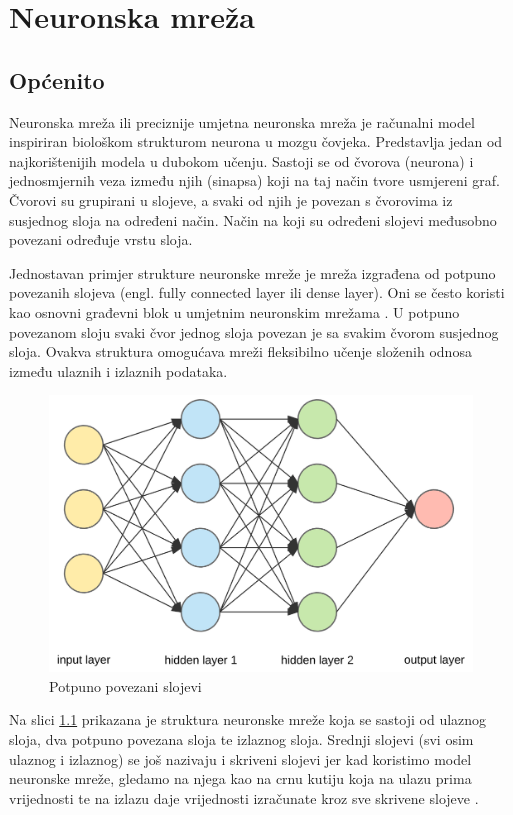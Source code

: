 \chapter{Neuronska mreža}
\label{pog:neuronska_mreza}

\section{Općenito}

Neuronska mreža ili preciznije umjetna neuronska mreža je računalni model inspiriran
biološkom strukturom neurona u mozgu čovjeka. Predstavlja jedan od najkorištenijih modela 
u dubokom učenju. Sastoji se od čvorova (neurona) i jednosmjernih
veza između njih (sinapsa) koji na taj način tvore usmjereni graf. Čvorovi su grupirani u slojeve,
a svaki od njih je povezan s čvorovima iz susjednog sloja na određeni način. Način na koji su
određeni slojevi međusobno povezani određuje vrstu sloja. 

Jednostavan primjer strukture neuronske mreže je mreža izgrađena od potpuno povezanih slojeva 
(engl. fully connected layer ili dense layer). Oni se često koristi kao osnovni građevni blok u 
umjetnim neuronskim mrežama \cite{dense}.
U potpuno povezanom sloju svaki čvor jednog sloja povezan je sa svakim čvorom susjednog sloja.
Ovakva struktura omogućava mreži fleksibilno učenje složenih odnosa između ulaznih i izlaznih podataka.

\begin{figure}[htb]
  \centering
  \includegraphics[width=0.5\linewidth]{Chapters/neuronska_mreza/dense_layer.png} 
  \caption{Potpuno povezani slojevi \cite{dense}}
  \label{pic:dense_layer}
\end{figure}

Na slici \ref{pic:dense_layer} prikazana je struktura neuronske mreže koja se sastoji od ulaznog sloja,
dva potpuno povezana sloja te izlaznog sloja. Srednji slojevi (svi osim ulaznog i izlaznog)
se još nazivaju i skriveni slojevi jer kad koristimo model neuronske mreže, gledamo
na njega kao na crnu kutiju koja na ulazu prima vrijednosti te na izlazu daje vrijednosti
izračunate kroz sve skrivene slojeve \cite{fully_connected}.

